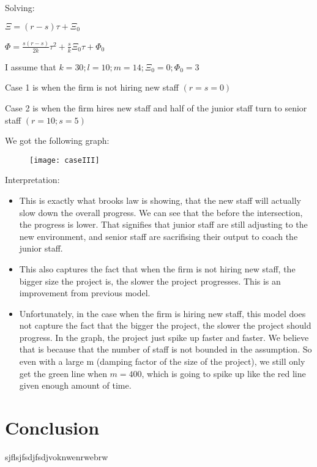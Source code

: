 \documentclass{article}
\newenvironment{atomize}
    {\begin{list} {} {
            \setlength\itemindent{0pt}
            \setlength\leftmargin{10pt}
            \setlength\labelwidth{0pt}
    }}
    {\end{list}}
\begin{document}
\begin{atomize}
\begin{atomize}
					\item Solving: 
							\begin{atomize}
								\item $\Xi = (r-s)\tau + \Xi_{0}$
								\item $\Phi = \frac{s(r-s)}{2k}\tau^{2} + \frac{s}{k}\Xi_{0}\tau + \Phi_{0}$
								\item I assume that $k = 30; l = 10; m = 14; \Xi_{0} = 0; \Phi_{0} = 3$ 
								\item Case 1 is when the firm is not hiring new staff $(r = s =
								0)$
								\item Case 2 is when the firm hires new staff and half of the
								junior staff turn to senior staff $(r=10; s=5)$
                \item We got the following graph:
							\end{atomize}
 		       \item 
    		      \begin{figure}[H]
        	    \centering
          	  \texttt{[image: caseIII]}
         	 \end{figure}

          \item Interpretation:
            \begin{itemize}
							\item This is exactly what brooks law is showing, that the new
							staff will actually slow down the overall progress. We can see
							that the before the intersection, the progress is lower. That
							signifies that junior staff are still adjusting to the new
							environment, and senior staff are sacrifising their output to
							coach the junior staff. 

							\item This also captures the fact that when the firm is not hiring
							new staff, the bigger size the project is, the slower the project
							progresses. This is an improvement from previous model.

							\item Unfortunately, in the case when the firm is hiring new
							staff, this model does not capture the fact that the bigger the
							project, the slower the project should progress. In the graph, the
							project just spike up faster and faster. We believe that is
							because that the number of staff is not bounded in the assumption.
							So even with a large m (damping factor of the size of the
							project), we still only get the green line when $m=400$, which is
							going to spike up like the red line given enough amount of time. 

            \end{itemize}


				\end{atomize}
			
		\end{atomize}

  \section*{Conclusion}
	sjflsjfsdjfsdjvoknwenrwebrw
		
\end{document}
